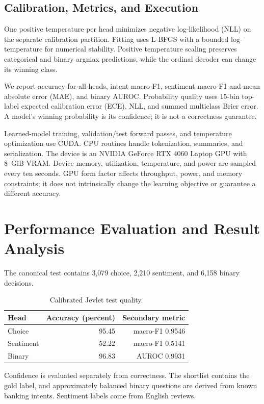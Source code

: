 \documentclass[conference]{IEEEtran}
\begin{document}
\subsection{Calibration, Metrics, and Execution}
One positive temperature per head minimizes negative log-likelihood (NLL) on the separate calibration partition. Fitting uses L-BFGS with a bounded log-temperature for numerical stability. Positive temperature scaling preserves categorical and binary argmax predictions, while the ordinal decoder can change its winning class.

We report accuracy for all heads, intent macro-F1, sentiment macro-F1 and mean absolute error (MAE), and binary AUROC. Probability quality uses 15-bin top-label expected calibration error (ECE), NLL, and summed multiclass Brier error. A model's winning probability is its confidence; it is not a correctness guarantee.

Learned-model training, validation/test forward passes, and temperature optimization use CUDA. CPU routines handle tokenization, summaries, and serialization. The device is an NVIDIA GeForce RTX 4060 Laptop GPU with 8~GiB VRAM. Device memory, utilization, temperature, and power are sampled every ten seconds. GPU form factor affects throughput, power, and memory constraints; it does not intrinsically change the learning objective or guarantee a different accuracy.

\section{Performance Evaluation and Result Analysis}
The canonical test contains 3,079 choice, 2,210 sentiment, and 6,158 binary decisions.
\begin{table}[ht]\centering
\begin{tabular}{lrr}\toprule
Head & Accuracy (percent) & Secondary metric\\\midrule
Choice & 95.45 & macro-F1 0.9546 \\
Sentiment & 52.22 & macro-F1 0.5141 \\
Binary & 96.83 & AUROC 0.9931 \\
\bottomrule\end{tabular}
\caption{Calibrated Jevlet test quality.}
\end{table}
Confidence is evaluated separately from correctness. The shortlist contains the gold label, and approximately balanced binary questions are derived from known banking intents. Sentiment labels come from English reviews.
\end{document}
